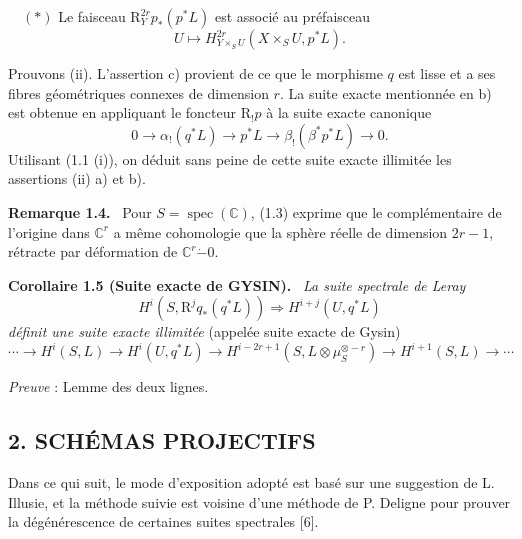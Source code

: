 \documentclass[11pt]{article}
\newenvironment{statement}[1]{\par\medskip\noindent\textbf{#1.}\ }{\par\medskip}
\newcommand{\R}{\mathrm{R}}\newcommand{\RHomCore}{\mathrm{RHom}}
\providecommand{\R}{\mathrm R}
\begin{document}
\(\quad (*)\) Le faisceau $\mathrm{R}_Y^{2r}p_*(p^*L)$ est associé au préfaisceau
\[
U\longmapsto H^{2r}_{Y\times_S U}(X\times_S U,p^*L).
\]

Prouvons (ii). L'assertion c) provient de ce que le morphisme $q$ est lisse et a ses fibres géométriques connexes de dimension $r$. La suite exacte mentionnée en b) est obtenue en appliquant le foncteur $\R_!p$ à la suite exacte canonique
\[
0\longrightarrow \alpha_!(q^*L)\longrightarrow p^*L\longrightarrow \beta_!(\beta^*p^*L)\longrightarrow 0.
\]
Utilisant (1.1 (i)), on déduit sans peine de cette suite exacte illimitée les assertions (ii) a) et b).

\begin{statement}{Remarque 1.4}
Pour $S=\operatorname{spec}(\mathbb C)$, (1.3) exprime que le complémentaire de l'origine dans $\mathbb C^r$ a même cohomologie que la sphère réelle de dimension $2r-1$, rétracte par déformation de $\mathbb C^r\mathbin{\dot{-}}0$.
\end{statement}

\begin{statement}{Corollaire 1.5 (Suite exacte de GYSIN)}
\emph{La suite spectrale de Leray}
\[
H^i(S,\mathrm{R}^j q_*(q^*L))\Rightarrow H^{i+j}(U,q^*L)
\]
\emph{définit une suite exacte illimitée} (appelée suite exacte de Gysin)
\[
\cdots\longrightarrow H^i(S,L)\longrightarrow H^i(U,q^*L)\longrightarrow
H^{i-2r+1}(S,L\otimes\mu_S^{\otimes -r})\longrightarrow H^{i+1}(S,L)\longrightarrow\cdots
\]
\end{statement}

\emph{Preuve} : Lemme des deux lignes.

\subsection*{2. SCHÉMAS PROJECTIFS}

Dans ce qui suit, le mode d'exposition adopté est basé sur une suggestion de L. Illusie, et la méthode suivie est voisine d'une méthode de P. Deligne pour prouver la dégénérescence de certaines suites spectrales [6].
\end{document}
